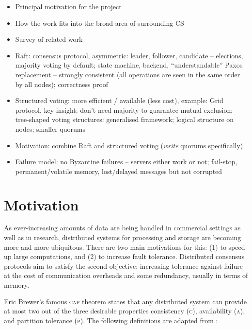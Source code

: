 \documentclass[11pt,chapterprefix=true,toc=bibliography,numbers=noendperiod]{scrreprt}
\begin{document}
\begin{itemize}
    \item Principal motivation for the project
    \item How the work fits into the broad area of surrounding CS
    \item Survey of related work
\end{itemize}

\begin{itemize}
    \item Raft: consensus protocol, asymmetric: leader, follower, candidate -- elections, majority voting by default; state machine, backend, ``understandable'' Paxos replacement -- strongly consistent (all operations are seen in the same order by all nodes); correctness proof \parencite{raft} \parencite{proof}
    \item Structured voting: more efficient / available (less cost), example: Grid protocol, key insight: don't need majority to guarantee mutual exclusion; tree-shaped voting structures: generalised framework; logical structure on nodes; smaller quorums
    \item Motivation: combine Raft and structured voting (\textit{write} quorums specifically)
    \item Failure model: no Byzantine failures -- servers either work or not; fail-stop, permanent/volatile memory, lost/delayed messages but not corrupted
\end{itemize}

\section{Motivation\label{sc:motivation}}

As ever-increasing amounts of data are being handled in commercial settings as well as in research, distributed systems for processing and storage are becoming more and more ubiquitous. There are two main motivations for this: (1) to speed up large computations, and (2) to increase fault tolerance. Distributed consensus protocols aim to satisfy the second objective: increasing tolerance against failure at the cost of communication overheads and some redundancy, usually in terms of memory.

Eric Brewer's famous \textsc{cap} theorem states that any distributed system can provide at most two out of the three desirable properties consistency (\textsc{c}), availability (\textsc{a}), and partition tolerance (\textsc{p}).\autocite{cap} The following definitions are adapted from \textcite{capproof}:
\end{document}
